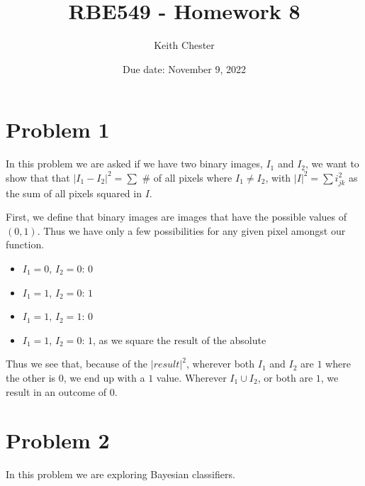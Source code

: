 \documentclass{article}
\title{RBE549 - Homework 8}
\author{Keith Chester}
\date{Due date: November 9, 2022}
\begin{document}
\maketitle

\section*{Problem 1}

In this problem we are asked if we have two binary images, $I_1$ and $I_2$, we want to show that that $|I_1 - I_2|^2 = \sum $ \# of all pixels where $I_1 \neq I_2$, with $|I|^2 = \sum i^2_{jk}$ as the sum of all pixels squared in $I$.

First, we define that binary images are images that have the possible values of $(0, 1)$. Thus we have only a few possibilities for any given pixel amongst our function.

\begin{itemize}
    \item $I_1=0$, $I_2=0$: $0$
    \item $I_1=1$, $I_2=0$: $1$
    \item $I_1=1$, $I_2=1$: $0$
    \item $I_1=1$, $I_2=0$: $1$, as we square the result of the absolute
\end{itemize}

Thus we see that, because of the $|result|^2$, wherever both $I_1$ and $I_2$ are $1$ where the other is $0$, we end up with a $1$ value. Wherever $I_1 \cup I_2$, or both are $1$, we result in an outcome of $0$.

\section*{Problem 2}

In this problem we are exploring Bayesian classifiers.
\end{document}
